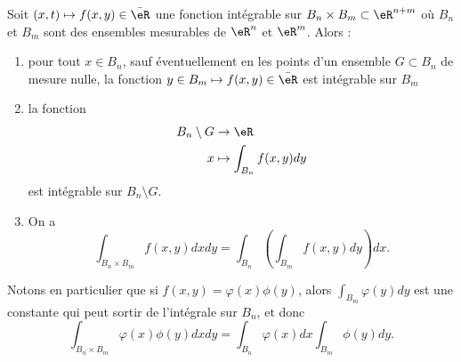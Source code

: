 \begin{theorem}[Fubini]\label{ThoFubini}
Soit $(x,t)\mapsto f(x,y)\in\bar \eR$ une fonction intégrable sur $B_n\times B_m\subset\eR^{n+m}$ où $B_n$ et $B_m$ sont des ensembles mesurables de $\eR^n$ et $\eR^m$. Alors :
\begin{enumerate}
\item pour tout $x\in B_n$, sauf éventuellement en les points d'un ensemble $G\subset B_n$ de mesure nulle, la fonction $y\in B_m\mapsto f(x,y)\in\bar\eR$ est intégrable sur $B_m$
\item
la fonction
\begin{equation}
    \begin{aligned}
        B_n\setminus G&\to \eR \\
        x&\mapsto \int_{B_n}f(x,y)dy 
    \end{aligned}
\end{equation}
est intégrable sur $B_n\setminus G$.
\item 
On a
\begin{equation}
	\int_{B_n\times B_m}f(x,y)dxdy=\int_{B_n}\left( \int_{B_m}f(x,y)dy \right)dx.
\end{equation}

\end{enumerate}
\end{theorem}

Notons en particulier que si $f(x,y)=\varphi(x)\phi(y)$, alors $\int_{B_m}\varphi(y)dy$ est une constante qui peut sortir de l'intégrale sur $B_n$, et donc
\begin{equation}		\label{EqFubiniFactori}
	\int_{B_n\times B_m}\varphi(x)\phi(y)dxdy=\int_{B_n}\varphi(x)dx\int_{B_m}\phi(y)dy.
\end{equation}

